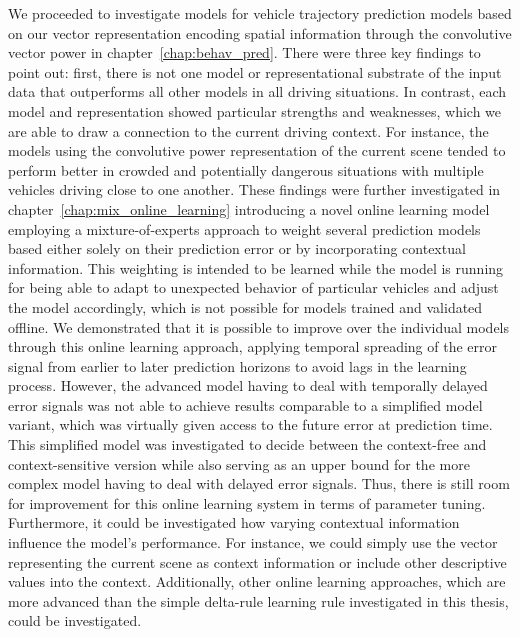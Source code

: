 We proceeded to investigate models for vehicle trajectory prediction models based on our vector representation encoding spatial information through the convolutive vector power in chapter~\ref{chap:behav_pred}.
There were three key findings to point out: first, there is not one model or representational substrate of the input data that outperforms all other models in all driving situations.
In contrast, each model and representation showed particular strengths and weaknesses, which we are able to draw a connection to the current driving context.
For instance, the models using the convolutive power representation of the current scene tended to perform better in crowded and potentially dangerous situations with multiple vehicles driving close to one another.
These findings were further investigated in chapter~\ref{chap:mix_online_learning} introducing a novel online learning model employing a mixture-of-experts approach to weight several prediction models based either solely on their prediction error or by incorporating contextual information.
This weighting is intended to be learned while the model is running for being able to adapt to unexpected behavior of particular vehicles and adjust the model accordingly, which is not possible for models trained and validated offline.
We demonstrated that it is possible to improve over the individual models through this online learning approach, applying temporal spreading of the error signal from earlier to later prediction horizons to avoid lags in the learning process.
However, the advanced model having to deal with temporally delayed error signals was not able to achieve results comparable to a simplified model variant, which was virtually given access to the future error at prediction time.
This simplified model was investigated to decide between the context-free and context-sensitive version while also serving as an upper bound for the more complex model having to deal with delayed error signals.
Thus, there is still room for improvement for this online learning system in terms of parameter tuning.
Furthermore, it could be investigated how varying contextual information influence the model's performance.
For instance, we could simply use the vector representing the current scene as context information or include other descriptive values into the context.
Additionally, other online learning approaches, which are more advanced than the simple delta-rule learning rule investigated in this thesis, could be investigated.

